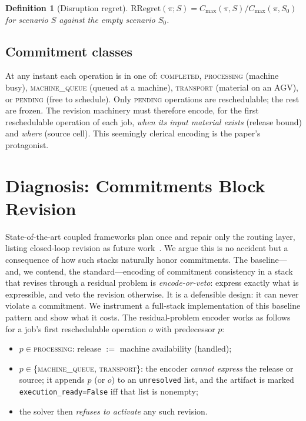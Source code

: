 \documentclass[twocolumn]{article}
\newtheorem{definition}{Definition}
\newcommand{\cmax}{C_{\max}}
\begin{document}
\begin{definition}[Disruption regret]
$\mathrm{RRegret}(\pi;S)=\cmax(\pi,S)/\cmax(\pi,S_0)$ for scenario $S$
against the empty scenario $S_0$.
\end{definition}

\subsection{Commitment classes}
At any instant each operation is in one of:
\textsc{completed}, \textsc{processing} (machine busy),
\textsc{machine\_queue} (queued at a machine), \textsc{transport}
(material on an AGV), or \textsc{pending} (free to schedule).
Only \textsc{pending} operations are reschedulable; the rest are frozen.
The revision machinery must therefore encode, for the first reschedulable
operation of each job, \emph{when its input material exists} (release
bound) and \emph{where} (source cell). This seemingly clerical encoding
is the paper's protagonist.

\section{Diagnosis: Commitments Block Revision}
\label{sec:diagnosis}
State-of-the-art coupled frameworks plan once and repair only the
routing layer, listing closed-loop revision as future
work~\cite{li2026framework}. We argue this is no accident but a
consequence of how such stacks naturally honor commitments. The
baseline---and, we contend, the standard---encoding of commitment
consistency in a stack that revises through a residual problem is
\emph{encode-or-veto}: express exactly what is expressible, and veto
the revision otherwise. It is a defensible design: it can never violate
a commitment. We instrument a full-stack implementation of this
baseline pattern and show what it costs. The residual-problem encoder
works as follows for a job's first reschedulable operation $o$ with
predecessor $p$:
\begin{itemize}
\item $p\in$\textsc{processing}: release $:=$ machine availability
(handled);
\item $p\in$\{\textsc{machine\_queue}, \textsc{transport}\}: the encoder
\emph{cannot express} the release or source; it appends $p$ (or $o$) to
an \texttt{unresolved} list, and the artifact is marked
\texttt{execution\_ready=False} iff that list is nonempty;
\item the solver then \emph{refuses to activate} any such revision.
\end{itemize}
\end{document}
